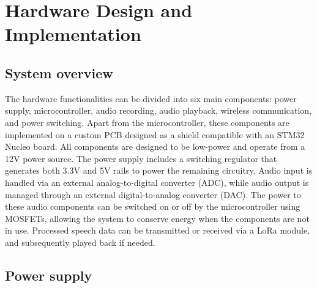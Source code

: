 \section{Hardware Design and Implementation}

\subsection{System overview}

The hardware functionalities can be divided into six main components: power supply, microcontroller, audio recording, audio playback, wireless communication, and power switching.
Apart from the microcontroller, these components are implemented on a custom PCB designed as a shield compatible with an STM32 Nucleo board.
All components are designed to be low-power and operate from a 12V power source.
The power supply includes a switching regulator that generates both 3.3V and 5V rails to power the remaining circuitry.
Audio input is handled via an external analog-to-digital converter (ADC), while audio output is managed through an external digital-to-analog converter (DAC).
The power to these audio components can be switched on or off by the microcontroller using MOSFETs, allowing the system to conserve energy when the components are not in use.
Processed speech data can be transmitted or received via a LoRa module, and subsequently played back if needed.

\subsection{Power supply}

